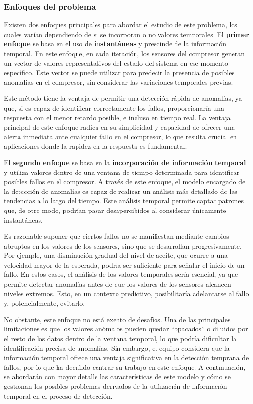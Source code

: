 \documentclass[12pt,letterpaper]{article}
\begin{document}
\subsubsection{Enfoques del problema}


Existen dos enfoques principales para abordar el estudio de este problema, los cuales varían dependiendo de si se incorporan o no valores temporales. El \textbf{primer enfoque} se basa en el uso de \textbf{instantáneas} y prescinde de la información temporal. En este enfoque, en cada iteración, los sensores del compresor generan un vector de valores representativos del estado del sistema en ese momento específico. Este vector se puede utilizar para predecir la presencia de posibles anomalías en el compresor, sin considerar las variaciones temporales previas.

Este método tiene la ventaja de permitir una detección rápida de anomalías, ya que, si es capaz de identificar correctamente los fallos, proporcionaría una respuesta con el menor retardo posible, e incluso en tiempo real. La ventaja principal de este enfoque radica en su simplicidad y capacidad de ofrecer una alerta inmediata ante cualquier fallo en el compresor, lo que resulta crucial en aplicaciones donde la rapidez en la respuesta es fundamental.

El \textbf{segundo enfoque} se basa en la \textbf{incorporación de información temporal} y utiliza valores dentro de una ventana de tiempo determinada para identificar posibles fallos en el compresor. A través de este enfoque, el modelo encargado de la detección de anomalías es capaz de realizar un análisis más detallado de las tendencias a lo largo del tiempo. Este análisis temporal permite captar patrones que, de otro modo, podrían pasar desapercibidos al considerar únicamente instantáneas.

Es razonable suponer que ciertos fallos no se manifiestan mediante cambios abruptos en los valores de los sensores, sino que se desarrollan progresivamente. Por ejemplo, una disminución gradual del nivel de aceite, que ocurre a una velocidad mayor de la esperada, podría ser suficiente para señalar el inicio de un fallo. En estos casos, el análisis de los valores temporales sería esencial, ya que permite detectar anomalías antes de que los valores de los sensores alcancen niveles extremos. Esto, en un contexto predictivo, posibilitaría adelantarse al fallo y, potencialmente, evitarlo.

No obstante, este enfoque no está exento de desafíos. Una de las principales limitaciones es que los valores anómalos pueden quedar ``opacados'' o diluidos por el resto de los datos dentro de la ventana temporal, lo que podría dificultar la identificación precisa de anomalías. Sin embargo, el equipo considera que la información temporal ofrece una ventaja significativa en la detección temprana de fallos, por lo que ha decidido centrar su trabajo en este enfoque. A continuación, se abordarán con mayor detalle las características de este modelo y cómo se gestionan los posibles problemas derivados de la utilización de información temporal en el proceso de detección.
\end{document}
